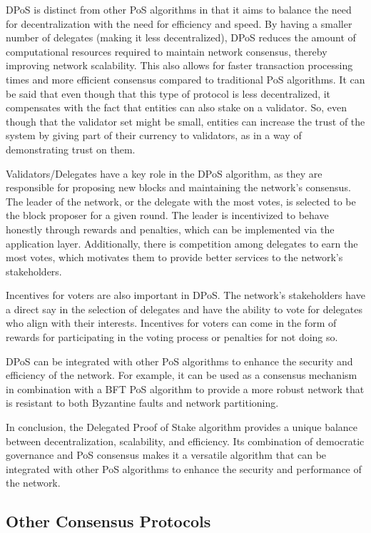 DPoS is distinct from other PoS algorithms in that it aims to balance the need for decentralization with the need for efficiency and speed. By having a smaller number of delegates (making it less decentralized), DPoS reduces the amount of computational resources required to maintain network consensus, thereby improving network scalability. This also allows for faster transaction processing times and more efficient consensus compared to traditional PoS algorithms.
It can be said that even though that this type of protocol is less decentralized, it compensates with the fact that entities can also stake on a validator. So, even though that the validator set might be small, entities can increase the trust of the system by giving part of their currency to validators, as in a way of demonstrating trust on them.

Validators/Delegates have a key role in the DPoS algorithm, as they are responsible for proposing new blocks and maintaining the network's consensus. The leader of the network, or the delegate with the most votes, is selected to be the block proposer for a given round. The leader is incentivized to behave honestly through rewards and penalties, which can be implemented via the application layer. Additionally, there is competition among delegates to earn the most votes, which motivates them to provide better services to the network's stakeholders.

Incentives for voters are also important in DPoS. The network's stakeholders have a direct say in the selection of delegates and have the ability to vote for delegates who align with their interests. Incentives for voters can come in the form of rewards for participating in the voting process or penalties for not doing so.

DPoS can be integrated with other PoS algorithms to enhance the security and efficiency of the network. For example, it can be used as a consensus mechanism in combination with a BFT PoS algorithm to provide a more robust network that is resistant to both Byzantine faults and network partitioning.

In conclusion, the Delegated Proof of Stake algorithm provides a unique balance between decentralization, scalability, and efficiency. Its combination of democratic governance and PoS consensus makes it a versatile algorithm that can be integrated with other PoS algorithms to enhance the security and performance of the network.

\subsection*{\textbf{Other Consensus Protocols}}

